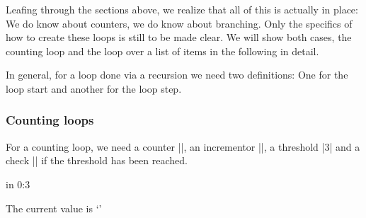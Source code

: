 \documentclass[a4paper]{ltxdoc}
\begin{document}
Leafing through the sections above, we realize that all of this is actually in place: We do know about counters, we do know about branching. Only the specifics of how to create these loops is still to be made clear. We will show both cases, the counting loop and the loop over a list of items in the following in detail.

In general, for a loop done via a recursion we need two definitions: One for the loop start and another for the loop step.

\subsubsection{Counting loops}
\label{sec:counting:loops}
For a counting loop, we need a counter ||, an incrementor |\advance|, a threshold |3| and a check |\ifnum{}| if the threshold has been reached.


\begin{codeexample}[]
\long{}

\long{}
 in 0:{3}{%
	The current value is `\the{}'\par
}
\end{codeexample}
\end{document}
